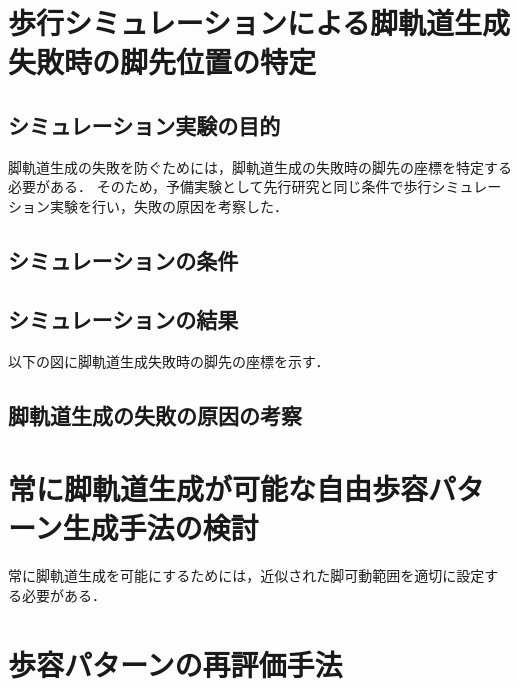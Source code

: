\section{歩行シミュレーションによる脚軌道生成失敗時の脚先位置の特定}

\subsection{シミュレーション実験の目的}
脚軌道生成の失敗を防ぐためには，脚軌道生成の失敗時の脚先の座標を特定する必要がある．
そのため，予備実験として先行研究と同じ条件で歩行シミュレーション実験を行い，失敗の原因を考察した．

\subsection{シミュレーションの条件}

\subsection{シミュレーションの結果}
以下の図に脚軌道生成失敗時の脚先の座標を示す．

\subsection{脚軌道生成の失敗の原因の考察}

\section{常に脚軌道生成が可能な自由歩容パターン生成手法の検討}
常に脚軌道生成を可能にするためには，近似された脚可動範囲を適切に設定する必要がある．


\section{歩容パターンの再評価手法}

